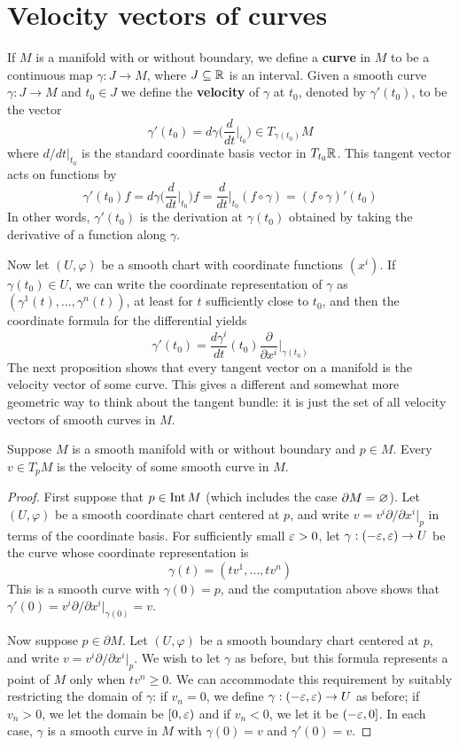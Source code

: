 \section{Velocity vectors of curves}
If $M$ is a manifold with or without boundary, we define a \textbf{curve} in $M$ to be a continuous map $\gamma:J\to M$, where $J\subseteq\mathbb{R}$ is an interval. Given a smooth
curve $\gamma:J\to M$ and $t_0\in J$ we define the \textbf{velocity} of $\gamma$ at $t_0$, denoted by $\gamma'(t_0)$, to be the vector
\[\gamma'(t_0)=d\gamma\Big(\frac{d}{dt}\Big|_{t_0}\Big)\in T_{\gamma(t_0)}M\]
where $d/dt|_{t_0}$ is the standard coordinate basis vector in $T_{t_0}\mathbb{R}$. This tangent vector acts on functions by
\[\gamma'(t_0)f=d\gamma\Big(\frac{d}{dt}\Big|_{t_0}\Big)f=\frac{d}{dt}\Big|_{t_0}(f\circ\gamma)=(f\circ\gamma)'(t_0)\]
In other words, $\gamma'(t_0)$ is the derivation at $\gamma(t_0)$ obtained by taking the derivative of a function along $\gamma$.\par
Now let $(U,\varphi)$ be a smooth chart with coordinate functions $(x^i)$. If $\gamma(t_0)\in U$, we can write the coordinate representation of $\gamma$ as $(\gamma^1(t),\dots,\gamma^n(t))$, at least for $t$ sufficiently close to $t_0$, and then the coordinate formula for the differential yields
\[\gamma'(t_0)=\frac{d\gamma^i}{dt}(t_0)\frac{\partial}{\partial x^i}\Big|_{\gamma(t_0)}\]
The next proposition shows that every tangent vector on a manifold is the velocity
vector of some curve. This gives a different and somewhat more geometric way to think about the tangent bundle: it is just the set of all velocity vectors of smooth
curves in $M$.
\begin{proposition}
Suppose $M$ is a smooth manifold with or without boundary and $p\in M$. Every $v\in T_pM$ is the velocity of some smooth curve in $M$.
\end{proposition}
\begin{proof}
First suppose that $p\in\mathrm{Int}\, M$ (which includes the case $\partial M=\varnothing$). Let $(U,\varphi)$ be a smooth coordinate chart centered at $p$, and write $v=v^i\partial/\partial x^i|_p$ in terms of the coordinate basis. For sufficiently small $\varepsilon>0$, let $\gamma:(-\varepsilon,\varepsilon)\to U$ be the curve whose coordinate representation is
\[\gamma(t)=(tv^1,\dots,tv^n)\]
This is a smooth curve with $\gamma(0)=p$, and the computation above shows that $\gamma'(0)=v^i\partial/\partial x^i|_{\gamma(0)}=v$.\par
Now suppose $p\in\partial M$. Let $(U,\varphi)$ be a smooth boundary chart centered at $p$, and write $v=v^i\partial/\partial x^i|_p$. We wish to let $\gamma$ as before, but this formula represents a point of $M$ only when $tv^n\geq 0$. We can accommodate this requirement by suitably restricting the domain of $\gamma$: if $v_n=0$, we define $\gamma:(-\varepsilon,\varepsilon)\to U$ as before; if $v_n>0$, we let the domain be $[0,\varepsilon)$ and if $v_n<0$, we let it be $(-\varepsilon,0]$. In each case, $\gamma$ is a smooth curve in $M$ with $\gamma(0)=v$ and $\gamma'(0)=v$.
\end{proof}
